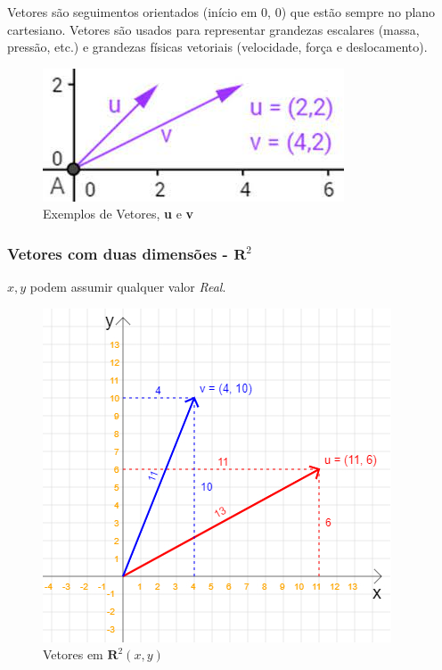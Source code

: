 \documentclass[12pt]{article}
\begin{document}
Vetores são seguimentos orientados (início em 0, 0) que estão sempre no plano cartesiano. Vetores são usados para representar grandezas escalares (massa, pressão, etc.) e grandezas físicas vetoriais (velocidade, força e deslocamento).

\begin{figure}[H]
	\centering
	\includegraphics[width=.5\linewidth]{figuras/vetores_01}
	\caption[Vetores \textbf{u} e \textbf{v}]{Exemplos de Vetores, \textbf{u} e \textbf{v}}
	\label{fig:vetores01}
\end{figure}

\subsubsection{Vetores com duas dimensões - \( \mathbf{R}^{2} \)}

\(x, y\) podem assumir qualquer valor \textit{Real}.

\begin{figure}[H]
	\centering
	\includegraphics[height=.45\textheight]{figuras/vetores_02}
	\caption[Vetores em \( \mathbf{R}^{2} \)]{Vetores em \( \mathbf{R}^{2} (x, y)\)}
	\label{fig:vetores02}
\end{figure}

\newpage
\end{document}
